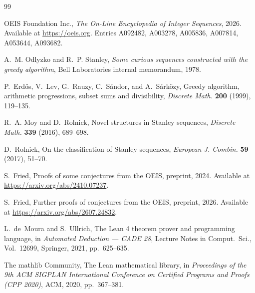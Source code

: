 \documentclass[12pt]{article}
\theoremstyle{plain}
\theoremstyle{definition}
\theoremstyle{remark}
\begin{document}
\begin{thebibliography}{99}

OEIS Foundation Inc., \emph{The On-Line Encyclopedia of Integer
Sequences}, 2026.  Available at \url{https://oeis.org}.  Entries
A092482, A003278, A005836, A007814, A053644, A093682.

A.~M. Odlyzko and R.~P. Stanley, \emph{Some curious sequences
constructed with the greedy algorithm}, Bell Laboratories
internal memorandum, 1978.

P.~Erd\H{o}s, V.~Lev, G.~Rauzy, C.~S\'andor, and A.~S\'ark\"ozy,
Greedy algorithm, arithmetic progressions, subset sums and
divisibility, \emph{Discrete Math.} \textbf{200} (1999),
119--135.

R.~A. Moy and D.~Rolnick, Novel structures in Stanley sequences,
\emph{Discrete Math.} \textbf{339} (2016), 689--698.

D.~Rolnick, On the classification of Stanley sequences,
\emph{European J. Combin.} \textbf{59} (2017), 51--70.

S.~Fried, Proofs of some conjectures from the OEIS, preprint,
2024.  Available at \url{https://arxiv.org/abs/2410.07237}.

S.~Fried, Further proofs of conjectures from the OEIS, preprint,
2026.  Available at \url{https://arxiv.org/abs/2607.24832}.

L.~de~Moura and S.~Ullrich, The Lean 4 theorem prover and
programming language, in \emph{Automated Deduction --- CADE 28},
Lecture Notes in Comput.\ Sci., Vol.~12699, Springer, 2021,
pp.~625--635.

The mathlib Community, The Lean mathematical library, in
\emph{Proceedings of the 9th ACM SIGPLAN International Conference
on Certified Programs and Proofs (CPP 2020)}, ACM, 2020,
pp.~367--381.

\end{thebibliography}
\end{document}
